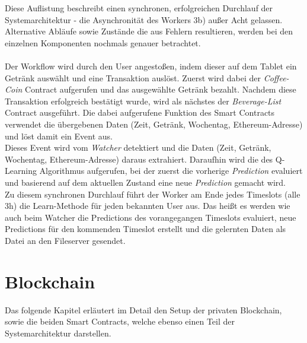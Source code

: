 Diese Auflistung beschreibt einen synchronen, erfolgreichen Durchlauf der Systemarchitektur - die Asynchronität des Workers 3b) außer Acht gelassen. Alternative Abläufe sowie Zustände die aus Fehlern resultieren, werden bei den einzelnen Komponenten nochmals genauer betrachtet.\\\\
Der Workflow wird durch den User angestoßen, indem dieser auf dem Tablet ein Getränk auswählt und eine Transaktion auslöst. Zuerst wird dabei der \textit{Coffee-Coin} Contract aufgerufen und das ausgewählte Getränk bezahlt. Nachdem diese Transaktion erfolgreich bestätigt wurde, wird als nächstes der \textit{Beverage-List} Contract ausgeführt. Die dabei aufgerufene Funktion des Smart Contracts verwendet die übergebenen Daten (Zeit, Getränk, Wochentag, Ethereum-Adresse) und löst damit ein Event aus. \\
Dieses Event wird vom \textit{Watcher} detektiert und die Daten (Zeit, Getränk, Wochentag, Ethereum-Adresse) daraus extrahiert. Daraufhin wird die  des Q-Learning Algorithmus aufgerufen, bei der zuerst die vorherige \textit{Prediction} evaluiert und basierend auf dem aktuellen Zustand eine neue \textit{Prediction} gemacht wird. \\
Zu diesem synchronen Durchlauf führt der Worker am Ende jedes Timeslots (alle 3h) die Learn-Methode für jeden bekannten User aus. Das heißt es werden wie auch beim Watcher die Predictions des vorangegangen Timeslots evaluiert, neue Predictions für den kommenden Timeslot erstellt und die gelernten Daten als Datei an den Fileserver gesendet.


\section{Blockchain}
\label{sec:bchain}

Das folgende Kapitel erläutert im Detail den Setup der privaten Blockchain, sowie die beiden Smart Contracts, welche ebenso einen Teil der Systemarchitektur darstellen.

